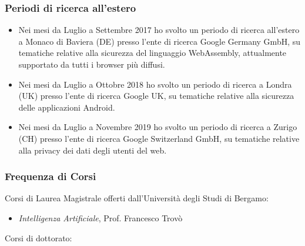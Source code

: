 \documentclass{article}
\begin{document}
\subsubsection*{Periodi di ricerca all'estero}

\begin{itemize}
	\item Nei mesi da Luglio a Settembre 2017 ho svolto un periodo di ricerca all'estero a Monaco di Baviera (DE) presso l'ente di ricerca Google Germany GmbH, su tematiche relative alla sicurezza del linguaggio WebAssembly, attualmente supportato da tutti i browser più diffusi.
	\item Nei mesi da Luglio a Ottobre 2018 ho svolto un periodo di ricerca a Londra (UK) presso l'ente di ricerca Google UK, su tematiche relative alla sicurezza delle applicazioni Android.
	\item Nei mesi da Luglio a Novembre 2019 ho svolto un periodo di ricerca a Zurigo (CH) presso l'ente di ricerca Google Switzerland GmbH, su tematiche relative alla privacy dei dati degli utenti del web.
\end{itemize}


\subsubsection*{Frequenza di Corsi}

\noindent Corsi di Laurea Magistrale offerti dall'Università degli Studi di Bergamo:

\begin{itemize}
	\item \textit{Intelligenza Artificiale}, Prof. Francesco Trovò
\end{itemize}

\smallskip
\noindent Corsi di dottorato:

\end{document}

